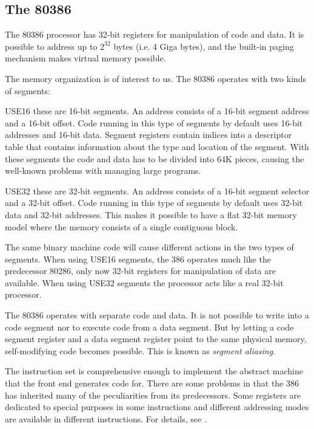 \subsection{The 80386} \label{sec:80386}

The 80386 processor has 32-bit registers for manipulation of code and
data. It is possible to address up to $2^{32}$ bytes (i.e.  4 Giga
bytes), and the built-in paging mechanism makes virtual memory
possible.

The memory organization is of interest to us. The 80386 operates with two
kinds of segments:

\begin{descit}{USE16} these are 16-bit segments. An address consists 
of a 16-bit segment address and a 16-bit offset. Code running in this
type of segments by default uses 16-bit addresses and 16-bit data.
Segment registers contain indices into a descriptor table that
contains information about the type and location of the segment. With
these segments the code and data has to be divided into 64K pieces,
causing the well-known problems with managing large programs.
\end{descit}
\begin{descit}{USE32} these are 32-bit segments. An address consists of a
 16-bit segment selector and a 32-bit offset. Code running in this
type of segments by default uses 32-bit data and 32-bit addresses.
This makes it possible to have a flat 32-bit memory model where the
memory consists of a single contiguous block.
\end{descit}

The same binary machine code will cause different actions in the two
types of segments. When using USE16 segments, the 386 operates much
like the predecessor 80286, only now 32-bit registers for manipulation
of data are available. When using USE32 segments the processor acts
like a real 32-bit processor.

The 80386 operates with separate code and data. It is not possible to
write into a code segment nor to execute code from a data segment. But
by letting a code segment register and a data segment register point
to the same physical memory, self-modifying code becomes possible.
This is known as {\em segment aliasing\/}.

The instruction set is comprehensive enough to implement the abstract
machine that the front end generates code for. There are some problems
in that the 386 has inherited many of the peculiarities from its
predecessors. Some registers are dedicated to special purposes in some
instructions and different addressing modes are available in different
instructions. For details, see \cite{bib:ysgsml}.

